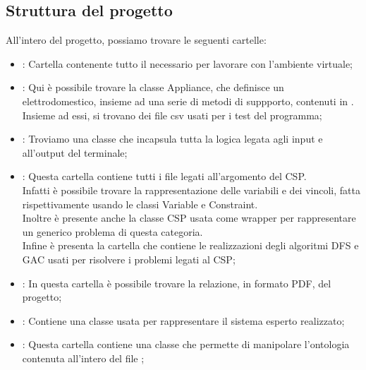 \documentclass[12pt, letterpaper]{article}
\begin{document}
\subsection{Struttura del progetto}

All'intero del progetto, possiamo trovare le seguenti cartelle:
\begin{itemize}
      \item {}: Cartella contenente tutto il necessario per lavorare con
            l'ambiente virtuale;

      \item {}: Qui è possibile trovare la classe Appliance, che definisce
            un elettrodomestico, insieme ad una serie di metodi di suppporto,
            contenuti in . Insieme ad essi, si trovano dei file csv
            usati per i test del programma;

      \item {}: Troviamo una classe che incapsula tutta la logica legata agli input
            e all'output del terminale;

      \item {}: Questa cartella contiene tutti i file legati all'argomento del
            CSP. \\
            Infatti è possibile trovare la rappresentazione delle variabili e dei vincoli, fatta
            rispettivamente usando le classi Variable e Constraint. \\
            Inoltre è presente anche la classe CSP usata come wrapper per rappresentare un generico
            problema di questa categoria. \\
            Infine è presenta la cartella  che contiene le realizzazioni degli
            algoritmi DFS e GAC usati per risolvere i problemi legati al CSP;

      \item {}: In questa cartella è possibile trovare la relazione, in formato PDF, del
            progetto;

      \item {}: Contiene una classe usata per rappresentare il sistema esperto
            realizzato;

      \item {}: Questa cartella contiene una classe che permette di manipolare
            l'ontologia contenuta all'intero del file ;


\end{itemize}
\end{document}
